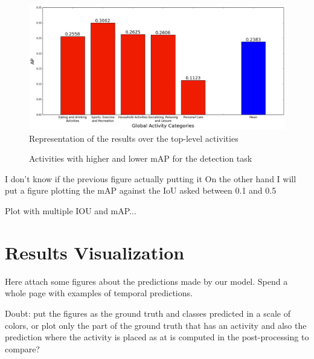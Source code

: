 \begin{figure}[H]
\begin{center}
\includegraphics[width=1\linewidth]{img/results/top_activities_detection_ap}
\end{center}
\caption{Representation of the results over the top-level activities}
\label{fig:top_level_detection_ap}
\end{figure}

\begin{figure}[H]
\begin{center}
\end{center}
\caption{Activities with higher and lower mAP for the detection task}
\label{fig:map_by_activity_detection}
\end{figure}

I don't know if the previous figure actually putting it
On the other hand I will put a figure plotting the mAP against the IoU asked between 0.1 and 0.5

Plot with multiple IOU and mAP...

\section{Results Visualization}

Here attach some figures about the predictions made by our model.
Spend a whole page with examples of temporal predictions.

Doubt: put the figures as the ground truth and classes predicted in a scale of colors,
or plot only the part of the ground truth that has an activity and also the prediction where the activity is placed as at is computed in the post-processing to compare?

